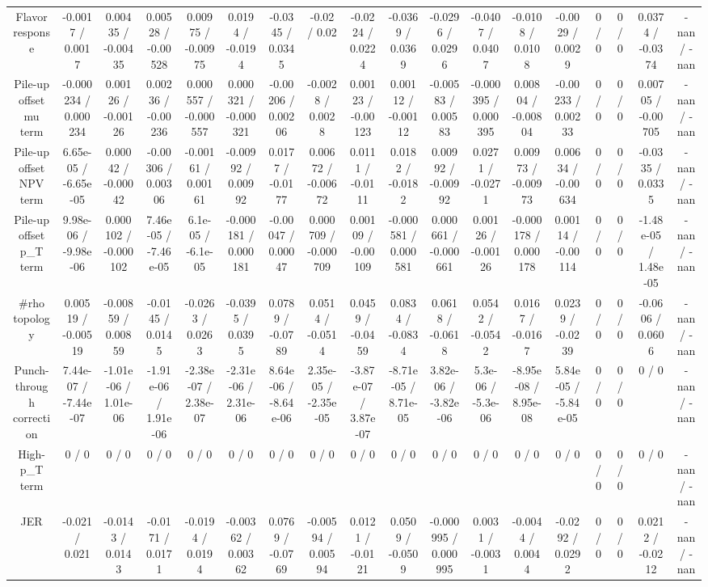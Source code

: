 \documentclass[10pt]{article}
\begin{document}
\begin{table}[htbp]
\begin{center}
\begin{tabular}{|c|c|c|c|c|c|c|c|c|c|c|c|c|c|c|c|c|c|}
  Flavor response & -0.0017 / 0.0017 & 0.00435 / -0.00435 & 0.00528 / -0.00528 & 0.00975 / -0.00975 & 0.0194 / -0.0194 & -0.0345 / 0.0345 & -0.02 / 0.02 & -0.0224 / 0.0224 & -0.0369 / 0.0369 & -0.0296 / 0.0296 & -0.0407 / 0.0407 & -0.0108 / 0.0108 & -0.0029 / 0.0029 & 0 / 0 & 0 / 0 & 0.0374 / -0.0374 & -nan / -nan \\ 
  Pile-up offset mu term & -0.000234 / 0.000234 & 0.00126 / -0.00126 & 0.00236 / -0.00236 & 0.000557 / -0.000557 & 0.000321 / -0.000321 & -0.00206 / 0.00206 & -0.0028 / 0.0028 & 0.00123 / -0.00123 & 0.00112 / -0.00112 & -0.00583 / 0.00583 & -0.000395 / 0.000395 & 0.00804 / -0.00804 & -0.00233 / 0.00233 & 0 / 0 & 0 / 0 & 0.00705 / -0.00705 & -nan / -nan \\ 
  Pile-up offset NPV term & 6.65e-05 / -6.65e-05 & 0.00042 / -0.00042 & -0.00306 / 0.00306 & -0.00161 / 0.00161 & -0.00992 / 0.00992 & 0.0177 / -0.0177 & 0.00672 / -0.00672 & 0.0111 / -0.0111 & 0.0182 / -0.0182 & 0.00992 / -0.00992 & 0.0271 / -0.0271 & 0.00973 / -0.00973 & 0.00634 / -0.00634 & 0 / 0 & 0 / 0 & -0.0335 / 0.0335 & -nan / -nan \\ 
  Pile-up offset p_{T} term & 9.98e-06 / -9.98e-06 & 0.000102 / -0.000102 & 7.46e-05 / -7.46e-05 & 6.1e-05 / -6.1e-05 & -0.000181 / 0.000181 & -0.00047 / 0.00047 & 0.000709 / -0.000709 & 0.00109 / -0.00109 & -0.000581 / 0.000581 & 0.000661 / -0.000661 & 0.00126 / -0.00126 & -0.000178 / 0.000178 & 0.00114 / -0.00114 & 0 / 0 & 0 / 0 & -1.48e-05 / 1.48e-05 & -nan / -nan \\ 
  #rho topology & 0.00519 / -0.00519 & -0.00859 / 0.00859 & -0.0145 / 0.0145 & -0.0263 / 0.0263 & -0.0395 / 0.0395 & 0.0789 / -0.0789 & 0.0514 / -0.0514 & 0.0459 / -0.0459 & 0.0834 / -0.0834 & 0.0618 / -0.0618 & 0.0542 / -0.0542 & 0.0167 / -0.0167 & 0.0239 / -0.0239 & 0 / 0 & 0 / 0 & -0.0606 / 0.0606 & -nan / -nan \\ 
  Punch-through correction & 7.44e-07 / -7.44e-07 & -1.01e-06 / 1.01e-06 & -1.91e-06 / 1.91e-06 & -2.38e-07 / 2.38e-07 & -2.31e-06 / 2.31e-06 & 8.64e-06 / -8.64e-06 & 2.35e-05 / -2.35e-05 & -3.87e-07 / 3.87e-07 & -8.71e-05 / 8.71e-05 & 3.82e-06 / -3.82e-06 & 5.3e-06 / -5.3e-06 & -8.95e-08 / 8.95e-08 & 5.84e-05 / -5.84e-05 & 0 / 0 & 0 / 0 & 0 / 0 & -nan / -nan \\ 
  High-p_{T} term & 0 / 0 & 0 / 0 & 0 / 0 & 0 / 0 & 0 / 0 & 0 / 0 & 0 / 0 & 0 / 0 & 0 / 0 & 0 / 0 & 0 / 0 & 0 / 0 & 0 / 0 & 0 / 0 & 0 / 0 & 0 / 0 & -nan / -nan \\ 
  JER & -0.021 / 0.021 & -0.0143 / 0.0143 & -0.0171 / 0.0171 & -0.0194 / 0.0194 & -0.00362 / 0.00362 & 0.0769 / -0.0769 & -0.00594 / 0.00594 & 0.0121 / -0.0121 & 0.0509 / -0.0509 & -0.000995 / 0.000995 & 0.0031 / -0.0031 & -0.0044 / 0.0044 & -0.0292 / 0.0292 & 0 / 0 & 0 / 0 & 0.0212 / -0.0212 & -nan / -nan \\ 

\end{tabular}
\end{center}
\end{table}
\end{document}
